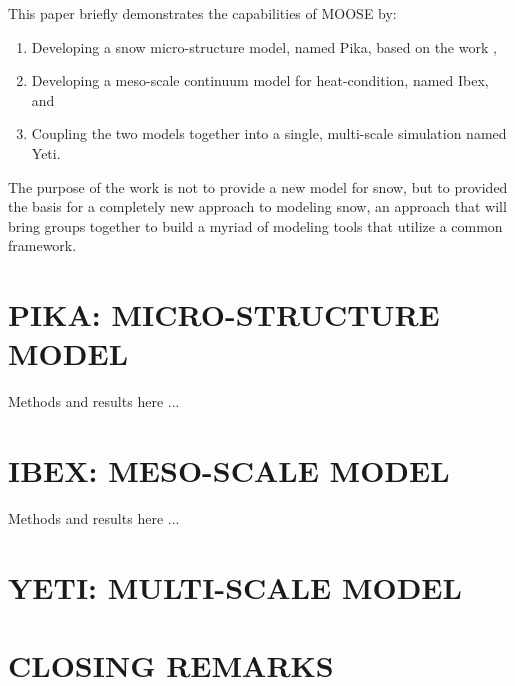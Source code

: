 This paper briefly demonstrates the capabilities of MOOSE by:
\begin{enumerate}
\item Developing a snow micro-structure model, named Pika, based on the work \citep{kaempfer2009phase},
\item Developing a meso-scale continuum model for heat-condition, named Ibex, and
\item Coupling the two models together into a single, multi-scale simulation named Yeti.
\end{enumerate}

The purpose of the work is not to provide a new model for snow, but to provided the basis for a completely new approach to modeling snow, an approach that will bring groups together to build a myriad of modeling tools that utilize a common framework.

\section{PIKA: MICRO-STRUCTURE MODEL}\label{sec:pika}
Methods and results here ...

\section{IBEX: MESO-SCALE MODEL}\label{sec:ibex}
Methods and results here ...

\section{YETI: MULTI-SCALE MODEL}\label{sec:yeti}


\section{CLOSING REMARKS}
